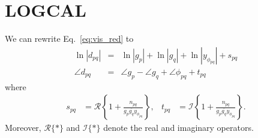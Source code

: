 \documentclass[useAMS,usenatbib]{mn2e}
\newcommand{\conj}[1]{\overline{#1}}
\begin{document}
% 
% 
% 







\appendix

\section{LOGCAL}
\label{sec:logcal}
We can rewrite Eq.~\eqref{eq:vis_red} to \citep{Liu2010}
\begin{eqnarray}
\ln |d_{pq}| &=& \ln |g_p| + \ln |g_q| + \ln |y_{\phi_{pq}}| + s_{pq} \label{eq:logcal_amp}\\
\angle d_{pq} &=& \angle g_p - \angle g_q + \angle \phi_{pq} + t_{pq} \label{eq:logcal_phase}
\end{eqnarray}
where
\begin{align}
s_{pq} &= \mathscr{R} \left \{1 + \frac{n_{pq}}{g_p\conj{g_q}y_{\phi_{pq}}} \right \}, & t_{pq} &= \mathscr{I}\left \{1 + \frac{n_{pq}}{g_p\conj{g_q}y_{\phi_{pq}}} \right \}.
\end{align}
Moreover, $\mathscr{R}\{*\}$ and $\mathscr{I}\{*\}$ denote the real and imaginary operators. 
\end{document}
